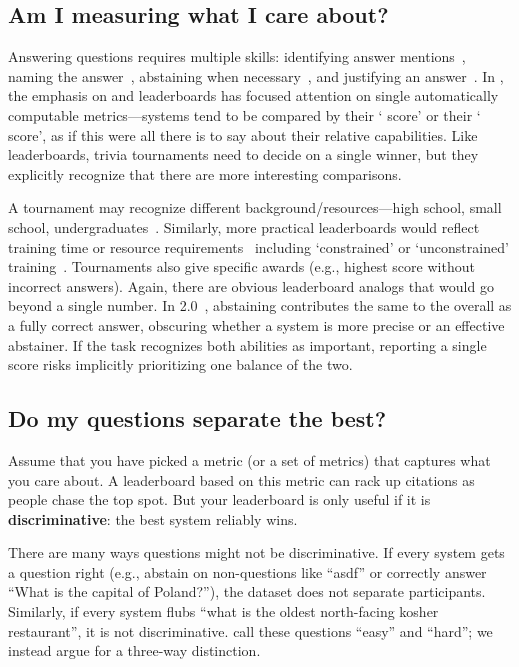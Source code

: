 \subsection{Am I measuring what I care about?}
\label{subsection:measuring-what-you-care-about}



Answering questions requires multiple skills: identifying answer mentions~\citep{hermann-15}, 
naming the answer~\citep{yih-15}, abstaining when necessary~\citep{rajpurkar-18}, and justifying an answer~\citep{fever-18}.
In \qa{}, the emphasis on  and leaderboards has focused attention on single automatically computable
metrics---systems tend to be compared by their `\squad{} score' or their ` score', as if this were all there
is to say about their relative capabilities.  Like  leaderboards, trivia tournaments need to decide
on a single winner, but they explicitly recognize that there are more interesting comparisons.

A tournament may recognize different background/resources---high school, small school, undergraduates~\citep{naqt-eligibility}.  Similarly, more practical leaderboards would reflect training time
or resource requirements~\citep[see][]{dodge-19} including `constrained' or `unconstrained'
training~\citep{bojar-2014}.
Tournaments also give specific awards (e.g., highest score without incorrect
answers).  Again, there are obvious leaderboard analogs that would go beyond a single number.  
In \squad{} 2.0~\citep{rajpurkar-18}, abstaining contributes the same
to the overall \fone{} as a fully correct answer, obscuring whether a system
is more precise or an effective abstainer.  If the task
recognizes both abilities as important, reporting a single score risks implicitly prioritizing one balance of the two.

\subsection{Do my questions separate the best?}
\label{sec:discriminative}

Assume that you have picked a metric (or a set of metrics) that captures what you care about.
A leaderboard based on this metric can rack up citations as people chase the top spot.
But your leaderboard is only useful if it is {\bf discriminative}: the best system reliably wins.

There are many ways questions might not be discriminative.  
If every system gets a question right (e.g., abstain on non-questions like ``asdf'' or correctly answer ``What is the capital of Poland?''), the dataset does not separate participants.  
Similarly, if every system flubs ``what is the oldest north-facing kosher restaurant'', it is not discriminative.
\citet{sugawara-18} call these questions ``easy'' and ``hard''; we instead argue for a three-way distinction.

